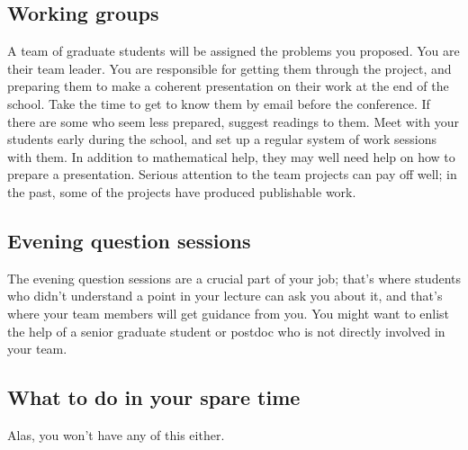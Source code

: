 \documentclass{article}
\begin{document}
\subsection{Working groups}
\label{sec:working-groups-1}
A team of graduate students will be assigned the problems you
proposed. You are their team leader. You are responsible for getting
them through the project, and preparing them to make a coherent
presentation on their work at the end of the school. Take the time to
get to know them by email before the conference. If there are some who
seem less prepared, suggest readings to them. Meet with your students
early during the school, and set up a regular system of work sessions
with them. In addition to
mathematical help, they may well need help on how to prepare a
presentation. Serious attention to the team projects can pay off well;
in the past, some of the projects have produced publishable work.


\subsection{Evening question sessions}
\label{sec:even-work-sess}
The evening question sessions are a crucial part of your job; that's
where students who didn't understand a point in your lecture can ask
you about it, and that's where your team members will get guidance
from you. You might want to enlist the help of a senior graduate
student or postdoc who is not directly involved in your team. 


\subsection{What to do in your spare time}
\label{sec:what-do-your-1}
Alas, you won't have any of this either. 
\end{document}
